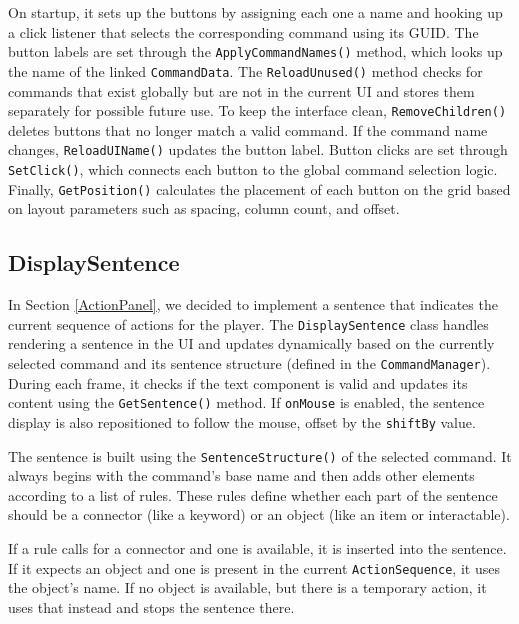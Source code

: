 On startup, it sets up the buttons by assigning each one a name and hooking up a click listener that selects the corresponding command using its GUID. The button labels are set through the \verb|ApplyCommandNames()| method, which looks up the name of the linked \verb|CommandData|. The \verb|ReloadUnused()| method checks for commands that exist globally but are not in the current UI and stores them separately for possible future use. To keep the interface clean, \verb|RemoveChildren()| deletes buttons that no longer match a valid command. If the command name changes, \verb|ReloadUIName()| updates the button label. Button clicks are set through \verb|SetClick()|, which connects each button to the global command selection logic. Finally, \verb|GetPosition()| calculates the placement of each button on the grid based on layout parameters such as spacing, column count, and offset.

 \subsection{DisplaySentence}
In Section \ref{ActionPanel}, we decided to implement a sentence that indicates the current sequence of actions for the player. The \verb|DisplaySentence| class handles rendering a sentence in the UI and updates dynamically based on the currently selected command and its sentence structure (defined in the \verb|CommandManager|). During each frame, it checks if the text component is valid and updates its content using the \verb|GetSentence()| method. If \verb|onMouse| is enabled, the sentence display is also repositioned to follow the mouse, offset by the \verb|shiftBy| value.

The sentence is built using the \verb|SentenceStructure()| of the selected command. It always begins with the command’s base name and then adds other elements according to a list of rules. These rules define whether each part of the sentence should be a connector (like a keyword) or an object (like an item or interactable).

If a rule calls for a connector and one is available, it is inserted into the sentence. If it expects an object and one is present in the current \verb|ActionSequence|, it uses the object's name. If no object is available, but there is a temporary action, it uses that instead and stops the sentence there.


